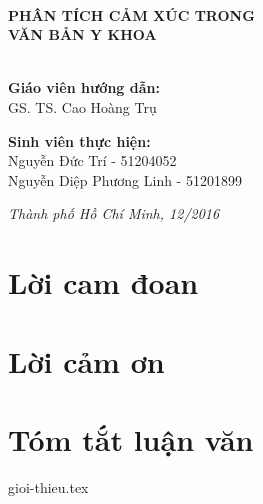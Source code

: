 \documentclass[a4paper, 12pt]{article}
\theoremstyle{definition}
\begin{document}
\begin{titlepage}
\HRule \\[0.4cm]
{ \huge \bfseries PHÂN TÍCH CẢM XÚC TRONG\\VĂN BẢN Y KHOA}\\[0.4cm] %
\HRule \\[0.8cm]

\begin{flushright}
\begin{minipage}{0.7\textwidth}

\end{minipage}
\end{flushright}

\begin{flushleft} \large
\textbf{Giáo viên hướng dẫn:}\\
GS. TS. Cao Hoàng Trụ\\[1.0cm]
\end{flushleft}

\begin{flushleft} \large
\textbf{Sinh viên thực hiện:}\\
Nguyễn Đức Trí - 51204052\\
Nguyễn Diệp Phương Linh - 51201899\\[1.5cm]
\end{flushleft}

\large \emph{Thành phố Hồ Chí Minh, 12/2016}

\vfill %
\end{titlepage}

\pagebreak
\section*{Lời cam đoan}
\pagebreak
\section*{Lời cảm ơn}
\pagebreak
\section*{Tóm tắt luận văn}


\pagebreak
\tableofcontents

\thispagestyle{empty}

\pagebreak
{gioi-thieu.tex}
\pagebreak
\end{document}

